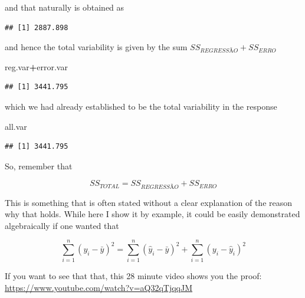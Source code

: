 \documentclass[
]{book}
\newenvironment{Shaded}{\begin{snugshade}}{\end{snugshade}}
\newcommand{\DecValTok}[1]{\textcolor[rgb]{0.00,0.00,0.81}{#1}}
\newcommand{\FunctionTok}[1]{\textcolor[rgb]{0.13,0.29,0.53}{\textbf{#1}}}
\newcommand{\NormalTok}[1]{#1}
\newcommand{\OtherTok}[1]{\textcolor[rgb]{0.56,0.35,0.01}{#1}}
\newcommand{\SpecialCharTok}[1]{\textcolor[rgb]{0.81,0.36,0.00}{\textbf{#1}}}
\begin{document}
and that naturally is obtained as

\begin{Shaded}
\end{Shaded}

\begin{verbatim}
## [1] 2887.898
\end{verbatim}

and hence the total variability is given by the sum \(SS_{REGRESSÃO}+SS_{ERRO}\)

\begin{Shaded}
\begin{Highlighting}[]
\NormalTok{reg.var}\SpecialCharTok{+}\NormalTok{error.var}
\end{Highlighting}
\end{Shaded}

\begin{verbatim}
## [1] 3441.795
\end{verbatim}

which we had already established to be the total variability in the response

\begin{Shaded}
\begin{Highlighting}[]
\NormalTok{all.var}
\end{Highlighting}
\end{Shaded}

\begin{verbatim}
## [1] 3441.795
\end{verbatim}

So, remember that

\[SS_{TOTAL}=SS_{REGRESSÃO}+SS_{ERRO}\]

This is something that is often stated without a clear explanation of the reason why that holds. While here I show it by example, it could be easily demonstrated algebraically if one wanted that

\[\sum_{i=1}^n (y_i- \bar y)^2=\sum_{i=1}^n (\hat y_i- \bar y)^2 + \sum_{i=1}^n (y_i- \hat y_i)^2\]

If you want to see that that, this 28 minute video shows you the proof: \url{https://www.youtube.com/watch?v=aQ32qTjqqJM}
\end{document}
